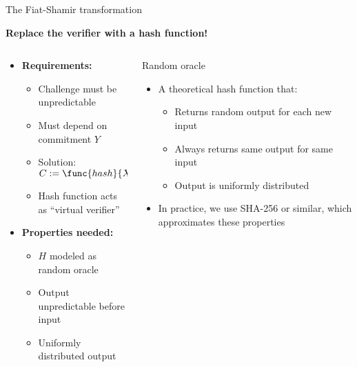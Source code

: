 \documentclass[aspectratio=169, lualatex, handout]{beamer}
\begin{document}
\begin{frame}{The Fiat-Shamir transformation}
	\begin{center}
		\textbf{Replace the verifier with a hash function!}
	\end{center}
	\vspace{0.5em}
	\begin{columns}[c]
		\begin{column}{0.5\textwidth}
			\begin{itemize}
				\item \textbf{Requirements:}
				      \begin{itemize}
					      \item Challenge must be unpredictable
					      \item Must depend on commitment $Y$
					      \item Solution: $C := \func{hash}{X, Y}$
					      \item Hash function acts as ``virtual verifier''
				      \end{itemize}
			\end{itemize}
			\begin{itemize}
				\item \textbf{Properties needed:}
				      \begin{itemize}
					      \item $H$ modeled as random oracle
					      \item Output unpredictable before input
					      \item Uniformly distributed output
				      \end{itemize}
			\end{itemize}
		\end{column}
		\begin{column}{0.5\textwidth}
			\begin{exampleblock}{Random oracle}
				\begin{itemize}
					\item A theoretical hash function that:
					      \begin{itemize}
						      \item Returns random output for each new input
						      \item Always returns same output for same input
						      \item Output is uniformly distributed
					      \end{itemize}
					\item In practice, we use SHA-256 or similar, which approximates these properties
				\end{itemize}
			\end{exampleblock}
		\end{column}
	\end{columns}
\end{frame}
\end{document}
